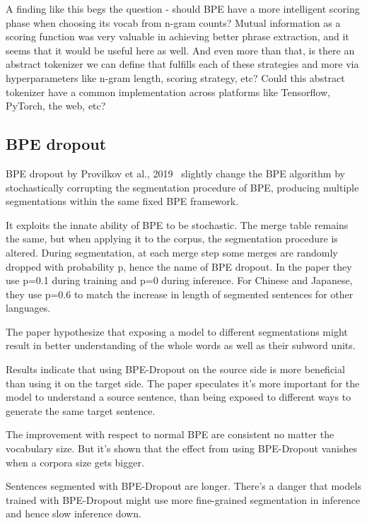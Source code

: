 A finding like this begs the question - should BPE have a more intelligent scoring phase when choosing its vocab from n-gram counts? Mutual information as a scoring function was very valuable in achieving better phrase extraction, and it seems that it would be useful here as well. And even more than that, is there an abstract tokenizer we can define that fulfills each of these strategies and more via hyperparameters like n-gram length, scoring strategy, etc? Could this abstract tokenizer have a common implementation across platforms like Tensorflow, PyTorch, the web, etc?

\subsection{BPE dropout}

BPE dropout by Provilkov et al., 2019~\cite{provilkov2019bpedropout} slightly change the BPE algorithm by stochastically corrupting the segmentation procedure of BPE, producing multiple segmentations within the same fixed BPE framework.

It exploits the innate ability of BPE to be stochastic. The merge table remains the same, but when applying it to the corpus, the segmentation procedure is altered. During segmentation, at each merge step some merges are randomly dropped with probability p, hence the name of BPE dropout. In the paper they use p=0.1 during training and p=0 during inference. For Chinese and Japanese, they use p=0.6 to match the increase in length of segmented sentences for other languages.

The paper hypothesize that exposing a model to different segmentations might result in better understanding of the whole words as well as their subword units.

Results indicate that using BPE-Dropout on the source side is more beneficial than using it on the target side. The paper speculates it's more important for the model to understand a source sentence, than being exposed to different ways to generate the same target sentence.

The improvement with respect to normal BPE are consistent no matter the vocabulary size. But it's shown that the effect from using BPE-Dropout vanishes when a corpora size gets bigger.

Sentences segmented with BPE-Dropout are longer. There's a danger that models trained with BPE-Dropout might use more fine-grained segmentation in inference and hence slow inference down.

